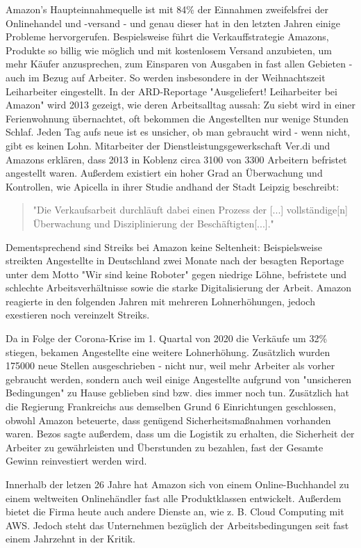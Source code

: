 Amazon’s Haupteinnahmequelle ist mit 84\% der Einnahmen zweifelsfrei der Onlinehandel und -versand\cite[Abb. 5]{Desjardins} - und genau dieser hat in den letzten Jahren einige Probleme hervorgerufen. Bespielsweise führt die Verkauffstrategie Amazons, Produkte so billig wie möglich und mit kostenlosem Versand anzubieten, um mehr Käufer anzusprechen\cite{Quartz}, zum Einsparen von Ausgaben in fast allen Gebieten - auch im Bezug auf Arbeiter\cite[S. 6]{Apicella}. So werden insbesondere in der Weihnachtszeit Leiharbeiter eingestellt. In der ARD-Reportage "Ausgeliefert! Leiharbeiter bei Amazon" wird 2013 gezeigt, wie deren Arbeitsalltag aussah: Zu siebt wird in einer Ferienwohnung übernachtet, oft bekommen die Angestellten nur wenige Stunden Schlaf. Jeden Tag aufs neue ist es unsicher, ob man gebraucht wird - wenn nicht, gibt es keinen Lohn. Mitarbeiter der Dienstleistungsgewerkschaft Ver.di und Amazons erklären, dass 2013 in Koblenz circa 3100 von 3300 Arbeitern befristet angestellt waren\cite{Ausgeliefert}.
Außerdem existiert ein hoher Grad an Überwachung und Kontrollen, wie Apicella in ihrer Studie andhand der Stadt Leipzig beschreibt\cite[S. 29]{Apicella}:
\begin{quote}
"Die Verkaufsarbeit durchläuft dabei einen Prozess der [...] vollständige[n] Überwachung und Disziplinierung der Beschäftigten[...]."
\end{quote}
Dementsprechend sind Streiks bei Amazon keine Seltenheit: Beispielsweise streikten Angestellte in Deutschland zwei Monate nach der besagten Reportage unter dem Motto "Wir sind keine Roboter" gegen niedrige Löhne, befristete und schlechte Arbeitsverhältnisse sowie die starke Digitalisierung der Arbeit\cite[S. 6]{Apicella}. Amazon reagierte in den folgenden Jahren mit mehreren Lohnerhöhungen, jedoch exestieren noch vereinzelt Streiks\cite{JGraf}.

Da in Folge der Corona-Krise im 1. Quartal von 2020 die Verkäufe um 32\% stiegen, bekamen Angestellte eine weitere Lohnerhöhung. Zusätzlich wurden 175000 neue Stellen ausgeschrieben - nicht nur, weil mehr Arbeiter als vorher gebraucht werden, sondern auch weil einige Angestellte aufgrund von "unsicheren Bedingungen" zu Hause geblieben sind bzw. dies immer noch tun. Zusätzlich hat die Regierung Frankreichs aus demselben Grund 6 Einrichtungen geschlossen, obwohl Amazon beteuerte, dass genügend Sicherheitsmaßnahmen vorhanden waren. Bezos sagte außerdem, dass um die Logistik zu erhalten, die Sicherheit der Arbeiter zu gewährleisten und Überstunden zu bezahlen, fast der Gesamte Gewinn reinvestiert werden wird\cite{Theweek}.

Innerhalb der letzen 26 Jahre hat Amazon sich von einem Online-Buchhandel zu einem weltweiten Onlinehändler fast alle Produktklassen entwickelt. Außerdem bietet die Firma heute auch andere Dienste an, wie z. B. Cloud Computing mit \ac{AWS}. Jedoch steht das Unternehmen bezüglich der Arbeitsbedingungen seit fast einem Jahrzehnt in der Kritik.

